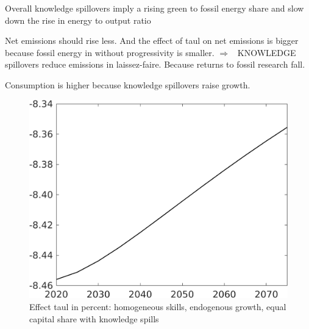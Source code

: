 \documentclass[12pt]{article}
\newcommand{\ar}{$\Rightarrow$ \ }
\begin{document}
Overall  knowledge spillovers imply a rising green to fossil energy share and slow down the rise in energy to output ratio


Net emissions should rise less. And the effect of taul on net emissions is bigger because fossil energy in without progressivity is smaller. \ar KNOWLEDGE spillovers reduce emissions in laissez-faire. Because returns to fossil research fall. 

Consumption is higher because knowledge spillovers raise growth. 

\begin{figure}[h!!]
	\centering
	\caption{Effect taul in percent: homogeneous skills, endogenous growth, equal capital share with knowledge spills}\label{fig:LF_BAU_nsk1_xgr0_equalcapShare_know}
	\begin{minipage}[]{0.32\textwidth}
		\includegraphics[width=1\textwidth]{../../codding_model/own_basedOnFried/optimalPol_010922_revision/figures/all_13Sept22/CompTaul_Equlab_LFBAUPer_Reg0_Emnet_spillover0_nsk1_xgr0_knspil0_sep1_countec0_GovRev0_etaa0.79.png}
	\end{minipage}	
	\begin{minipage}[]{0.32\textwidth}

\end{minipage}
\end{figure}
\end{document}
